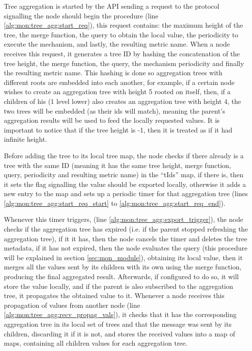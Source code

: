 

Tree aggregation is started by the API sending a request to the protocol signalling the node should begin the procedure (line \ref{alg:mon:tree_agg:start_req}), this request contains: the maximum height of the tree, the merge function, the query to obtain the local value, the periodicity to execute the mechanism, and lastly, the resulting metric name. When a node receives this request, it generates a tree ID by hashing the concatenation of the tree height, the merge function, the query, the mechanism periodicity and finally the resulting metric name. This hashing is done so aggregation trees with different roots are embedded into each another, for example, if a certain node wishes to create an aggregation tree with height 5 rooted on itself, then, if a children of his (1 level lower) also creates an aggregation tree with height 4, the two trees will be embedded (as their ids will match), meaning the parent's aggregation results will be used to feed the locally requested values. It is important to notice that if the tree height is -1, then it is treated as if it had infinite height.

Before adding the tree to its local tree map, the node checks if there already is a tree with the same ID (meaning it has the same tree height, merge function, query, periodicity and resulting metric name) in the ``tIds'' map, if there is, then it sets the flag signalling the value should be exported locally, otherwise it adds a new entry to the map and sets up a periodic timer for that aggregation tree (lines \ref{alg:mon:tree_agg:start_req_start} to \ref{alg:mon:tree_agg:start_req_end}).

Whenever this timer triggers, (line \ref{alg:mon:tree_agg:export_trigger}), the node checks if the aggregation tree has expired (i.e. if the parent stopped refreshing the aggregation tree), if it it has, then the node cancels the timer and deletes the tree metadata, if it has not expired, then the node evaluates the query (this procedure will be explained in section \ref{sec:mon_module}), obtaining its local value, then it merges all the values sent by its children with its own using the merge function, producing the final aggregated result. Afterwards, if configured to do so, it will store the value locally, and if the parent is also subscribed to the aggregation tree, it propagates the obtained value to it. Whenever a node receives this propagation of values from another node (line \ref{alg:mon:tree_agg:recv_propag_vals}), it checks that it has the corresponding aggregation tree in its local set of trees and that the message was sent by its children, discarding it if it is not, and stores the received values into a map of maps, containing all children values for each aggregation tree.

